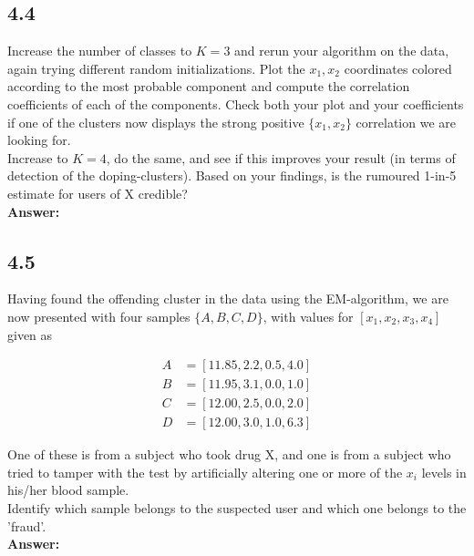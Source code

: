 \documentclass[a4paper]{article}
\begin{document}
\subsection*{4.4}

Increase the number of classes to $K = 3$ and rerun your algorithm on the data, again trying different random initializations. Plot the $x_1, x_2$ coordinates colored according to the most probable component and compute the correlation coefficients of each of the components. Check both your plot and your coefficients if one of the clusters now displays the strong positive $\{ x_1, x_2\}$ correlation we are looking for.\\
Increase to $K = 4$, do the same, and see if this improves your result (in terms of detection of the doping-clusters). Based on your findings, is the rumoured 1-in-5 estimate for users of X credible?\\


\textbf{Answer:}\\



\subsection*{4.5}

Having found the offending cluster in the data using the EM-algorithm, we are now presented with four samples $\{ A, B, C, D\}$, with values for $[x_1, x_2, x_3, x_4]$ given as 

\begin{align*}
A &= [11.85, 2.2, 0.5, 4.0]\\
B &= [11.95, 3.1, 0.0, 1.0]\\
C &= [12.00, 2.5, 0.0, 2.0]\\
D &= [12.00, 3.0, 1.0, 6.3]
\end{align*}

One of these is from a subject who took drug X, and one is from a subject who tried to tamper with the test by artificially altering one or more of the $x_i$ levels in his/her blood sample.\\

Identify which sample belongs to the suspected user and which one belongs to the 'fraud'.\\

\textbf{Answer:}\\
\end{document}
